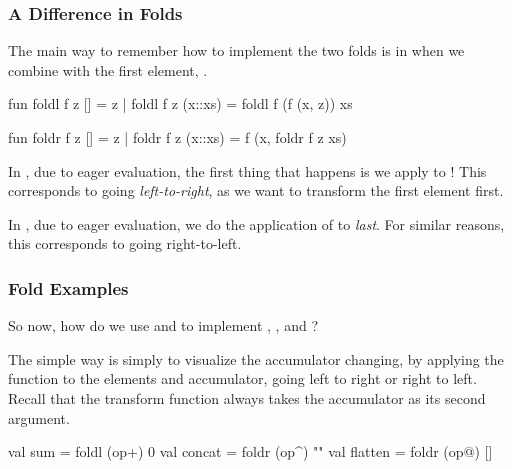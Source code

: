 \documentclass[aspectratio=169]{beamer}
\begin{document}
\begin{frame}[fragile]
  \frametitle{A Difference in Folds}

  The main way to remember how to implement the two folds is in when we
  combine with the first element, .

  \pause
  \vspace{\fill}

  \begin{codeblock}
    fun foldl f z [] = z
      | foldl f z (x::xs) = foldl f (f (x, z)) xs

    fun foldr f z [] = z
      | foldr f z (x::xs) = f (x, foldr f z xs)
  \end{codeblock}

  \pause
  \vspace{\fill}

  In , due to eager evaluation, the first thing that happens is we
  apply  to ! This corresponds to going \textit{left-to-right},
  as we want to transform the first element first.

  \pause
  \vspace{\fill}

  In , due to eager evaluation, we do the application of 
  to  \textit{last}. For similar reasons, this corresponds to going
  right-to-left.
\end{frame}

\begin{frame}[fragile]
  \frametitle{Fold Examples}

  So now, how do we use  and  to implement
  , , and ?

  \pause
  \vspace{\fill}

  The simple way is simply to visualize the accumulator changing, by
  applying the function to the elements and accumulator, going left to
  right or right to left. Recall that the transform function 
  always takes the accumulator as its second argument.

  \pause
  \vspace{\fill}

  \begin{codeblock}
    val sum = foldl (op+) 0
    val concat = foldr (op^) ""
    val flatten = foldr (op@) []
  \end{codeblock}
\end{frame}
\end{document}
